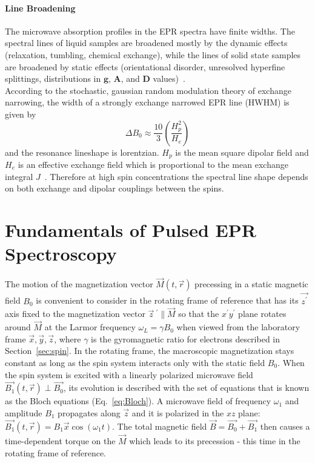 \paragraph{Line Broadening}
The microwave absorption profiles in the EPR spectra have finite widths. The spectral lines of liquid samples are broadened mostly by the dynamic effects (relaxation, tumbling, chemical exchange), while the lines of solid state samples are broadened by static effects (orientational disorder, unresolved hyperfine splittings, distributions in $\textbf{g}$, $\textbf{A}$, and $\textbf{D}$ values)~\cite{Stoll2006}.\\

According to the stochastic, gaussian random modulation theory of exchange narrowing, the width of a strongly exchange narrowed EPR line (HWHM) is given by
\begin{equation}
\label{eq:exch_narrowing}
\Delta B_0 \approx\frac{10}{3}\left(\frac{H_p^2}{H_e}\right)
\end{equation}
and the resonance lineshape is lorentzian. $H_p$ is the mean square dipolar field and $H_e$ is an effective exchange field which is proportional to the mean exchange integral $J$~\cite{Oreilly_1971}. Therefore at high spin concentrations the spectral line shape depends on both exchange and dipolar couplings between the spins.\\



\section{Fundamentals of Pulsed EPR Spectroscopy}
\label{ch:pulsed_epr}

The motion of the magnetization vector $\vec{M}(t,\vec{r})$ precessing in a static magnetic field $B_0$ is convenient to consider in the rotating frame of reference that has its $\vec{z^{\prime}}$ axis fixed to the magnetization vector ${\vec{z}}~^{\prime}\parallel\vec{M}$ so that the $x^{\prime} y^{\prime}$ plane rotates around $\vec{M}$ at the Larmor frequency $\omega_L=\gamma B_0$ when viewed from the laboratory frame $\vec{x},\vec{y},\vec{z}$, where $\gamma$ is the gyromagnetic ratio for electrons described in Section~\ref{sec:spin}. In the rotating frame, the macroscopic magnetization stays constant as long as the spin system interacts only with the static field $B_0$. When the spin system is excited with a linearly polarized microwave field $\vec{B_1}(t,\vec{r})\perp\vec{B_0}$, its evolution is described with the set of equations that is known as the Bloch equations (Eq.~\ref{eq:Bloch}). A microwave field of frequency $\omega_1$ and amplitude $B_1$ propagates along $\vec{z}$ and it is polarized in the $xz$ plane: $\vec{B_1}(t,\vec{r})=B_1\vec{x}\cos\left(\omega_1t\right)$. The total magnetic field $\vec{B}=\vec{B_0}+\vec{B_1}$ then causes a time-dependent torque on the $\vec{M}$ which leads to its precession - this time in the rotating frame of reference.

